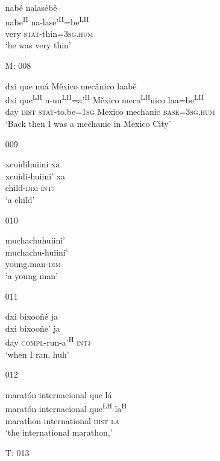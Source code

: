 \begin{itemize}
\glll nab\'{e} nalas\'{e}b\v{e}\\
nabe\textsuperscript{H} na-lase'\textsuperscript{H}=be\textsuperscript{LH} \\
very \textsc{stat}-thin=\textsc{3sg.hum}\\
\glt `he was very thin' 
 

\item[M: 008]
   
\glll dxi que nu\'{a} M\v{e}xico mec\v{a}nico laab\v{e}\\
dxi que\textsuperscript{LH} n-uu\textsuperscript{LH}=a'\textsuperscript{H}  M\v{e}xico meca\textsuperscript{LH}nico laa=be\textsuperscript{LH}\\
day \textsc{dist} \textsc{stat}-to.be=\textsc{1sg} Mexico mechanic \textsc{base}=\textsc{3sg.hum} \\
\glt `Back then I was a mechanic in Mexico City'
 

\item[009]
   
\glll xcuidihuiini xa\\
xcuidi-huiini' xa \\
child-\textsc{dim} \textsc{intj}\\
\glt `a child'
 

\item[010]
   
\glll muchachuhuiini'\\
muchachu-huiini' \\
young.man-\textsc{dim} \\
\glt `a young man'
 

\item[011]
  
\glll dxi bixoo\~{n}\'{e} ja\\
dxi bixoo\~{n}e' ja\\
day \textsc{compl}-run-a'\textsuperscript{H} \textsc{intj}\\
\glt `when I ran, huh'
 

\item[012]
  
\glll marat\'{o}n internacional que l\'{a}\\
marat\'{o}n internacional que\textsuperscript{LH} la\textsuperscript{H}\\
marathon	international \textsc{dist} \textsc{la}\\
\glt `the international marathon,'
 

\item[T: 013]
    

\end{itemize}

